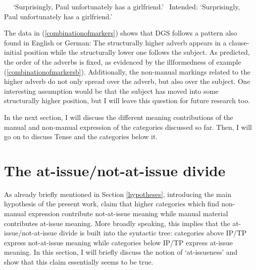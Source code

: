 \begin{exe}
\ex\label{combinationofmarkers}\begin{xlist}
\ex \textcolor{white}{*} 
\glt \textcolor{white}{*}`Surprisingly, Paul unfortunately has a girlfriend.'\label{combinationofmarkersa}
\ex * 
\glt \textcolor{white}{*}Intended: `Surprisingly, Paul unfortunately has a girlfriend.'\label{combinationofmarkersb}
\end{xlist}
\end{exe}

\noindent The data in (\ref{combinationofmarkers}) shows that DGS follows a pattern also found in English or German: The structurally higher adverb appears in a clause-initial position while the structurally lower one follows the subject. As predicted, the order of the adverbs is fixed, as evidenced by the illformedness of example (\ref{combinationofmarkersb}). Additionally, the non-manual markings related to the higher adverb do not only spread over the adverb, but also over the subject. One interesting assumption would be that the subject has moved into some structurally higher position, but I will leave this question for future research too.

In the next section, I will discuss the different meaning contributions of the manual and non-manual expression of the categories discussed so far. Then, I will go on to discuss Tense and the categories below it.




\section{The at-issue/not-at-issue divide}\label{atnotissue}
As already briefly mentioned in Section \ref{hypotheses}, introducing the main hypothesis of the present work, \citet{bross2017scope} claim that higher categories which find non-manual expression contribute not-at-issue meaning while manual material contributes at-issue meaning. More broadly speaking, this implies that the at-issue/not-at-issue divide is built into the syntactic tree: categories above IP/TP express not-at-issue meaning while categories below IP/TP express at-issue meaning. In this section, I will briefly discuss the notion of `at-issueness' and show that this claim essentially seems to be true.

